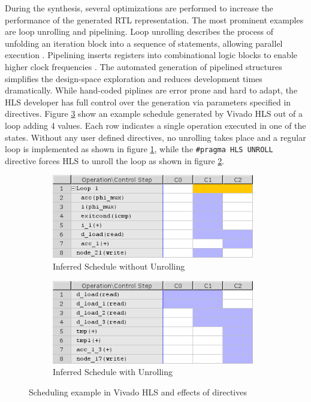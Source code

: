 During the synthesis, several optimizations are performed to increase the
performance of the generated \ac{RTL} representation. The most prominent
examples are loop unrolling and pipelining. Loop unrolling describes the
process of unfolding an iteration block into a sequence of statements,
allowing parallel execution \citep{SWL13}. Pipelining inserts registers into
combinational logic blocks to enable higher clock frequencies \citep{SWL13}.
The automated generation of pipelined structures simplifies the design-space
exploration and reduces development times dramatically. While hand-coded
piplines are error prone and hard to adapt, the \ac{HLS} developer has full
control over the generation via parameters specified in directives. Figure
\ref{fig:hls} show an example schedule generated by Vivado HLS out of a loop
adding 4 values. Each row indicates a single operation executed in one of the
states. Without any user defined directives, no unrolling takes place and a
regular loop is implemented as shown in figure \ref{fig:hls_n}, while the
\lstinline{#pragma HLS UNROLL} directive forces \ac{HLS} to unroll the loop as
shown in figure
\ref{fig:hls_u}.
%
%
%
\begin{figure}[tb]
	\centering
	\begin{subfigure}{0.49\textwidth}
		\centering
		\includegraphics[width=0.97\textwidth]{../figures/hls_n}
		\caption{Inferred Schedule without Unrolling}
		\label{fig:hls_n}
	\end{subfigure}
	\begin{subfigure}{0.49\textwidth}
		\centering
		\includegraphics[width=0.97\textwidth]{../figures/hls_u}
		\caption{Inferred Schedule with Unrolling}
		\label{fig:hls_u}
	\end{subfigure}
	\caption{Scheduling example in Vivado HLS and effects of directives}
	\label{fig:hls}
\end{figure}

